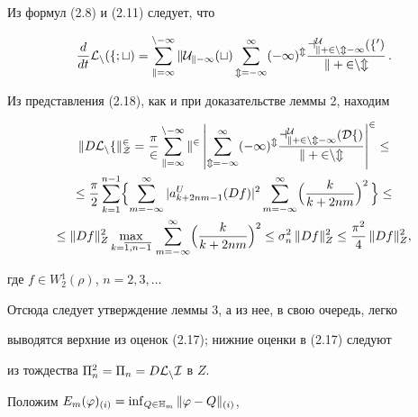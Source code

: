 \begin{pf}


Из формул (2.8) и (2.11) следует, что


\begin{equation}


\frac{d}{dt}\cal{L}_n(f;t)=


\sum_{k=1}^{n-1}kU_{k-1}(t)\sum_{m=-\infty }^\infty (-1)^m


\frac{a^U_{k+2nm-1}(f')}{k+2nm}\, .


\end{equation}


Из представления (2.18), как и при доказательстве леммы 2, находим


\begin{gather}


\|D\cal{L}_nf\|_Z^2=\frac{\pi }{2}


\sum_{k=1}^{n-1}k^2\left| \sum_{m=-\infty }


^\infty (-1)^m\frac{a^U_{k+2nm-1}(Df)}{k+2nm}\right|^2\le\notag\\


%


\le \frac{\pi }{2}\sum_{k=1}^{n-1}\Bigl\{ \sum_{m=-\infty }


^\infty |a^U_{k+2nm-1}(Df)|^2 \sum_{m=-\infty }^\infty


\Bigl( \frac{k}{k+2nm}\Bigr)^2\, \Bigr\} \le\notag\\


%


\le \|Df\|_Z^2 \max_{k=\overline{1,n-1}}\,


\sum_{m=-\infty }^\infty \Bigl( \frac{k}{k+2nm}\Bigr)^2\le


\sigma_n^2\, \|Df\|_Z^2\le


\frac{\pi^2}{4}\,\|Df\|_Z^2 ,


\end{gather}


где $f\in W{}_2^1(\rho )$, $n=2,3,\dotsc$


Отсюда следует утверждение леммы 3, а из нее, в свою очередь, легко


выводятся верхние из оценок (2.17); нижние оценки в (2.17) следуют


из тождества $\Pi_n^2=\Pi_n=D\cal{L}_nI$ в $Z$.


\end{pf}





Положим $E_m(\varphi )_{(i)}=\inf_{Q\in \Bbb{H}_m}\|\varphi -Q\|_{(i)}$,


